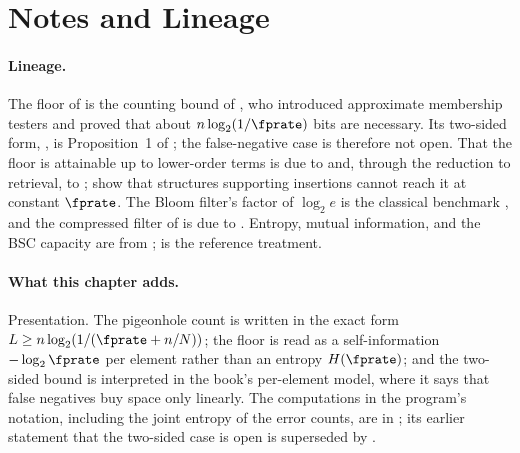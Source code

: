 %

\section{Notes and Lineage}
\label{sec:bib-notes-ch8}

\paragraph{Lineage.}
The floor of  is the counting bound of
\textcite{carter-et-al-1978}, who introduced approximate membership testers
and proved that about $n\log_2(1/\fprate)$ bits are necessary. Its two-sided
form, , is Proposition~1 of
\textcite{pagh-rodler-2001}; the false-negative case is therefore not open.
That the floor is attainable up to lower-order terms is due to
\textcite{pagh-pagh-rao-2005} and, through the reduction to retrieval, to
\textcite{dietzfelbinger-pagh-2008}; \textcite{lovett-porat-2010} show that
structures supporting insertions cannot reach it at constant $\fprate$. The
Bloom filter's factor of $\log_2 e$ is the classical benchmark
\parencite{broder-mitzenmacher-2004}, and the compressed filter of
 is due to \textcite{mitzenmacher-2002}. Entropy,
mutual information, and the BSC capacity are from \textcite{shannon-1948};
\textcite{cover-thomas} is the reference treatment.

\paragraph{What this chapter adds.}
Presentation. The pigeonhole count is written in the exact form $L \ge
n\log_2(1/(\fprate + n/N))$; the floor is read as a self-information
$-\log_2\fprate$ per element rather than an entropy $H(\fprate)$; and the
two-sided bound is interpreted in the book's per-element model, where it says
that false negatives buy space only linearly. The computations in the
program's notation, including the joint entropy of the error counts, are in
\textcite{towell-bernoulli-entropy}; its earlier statement that the two-sided
case is open is superseded by .


